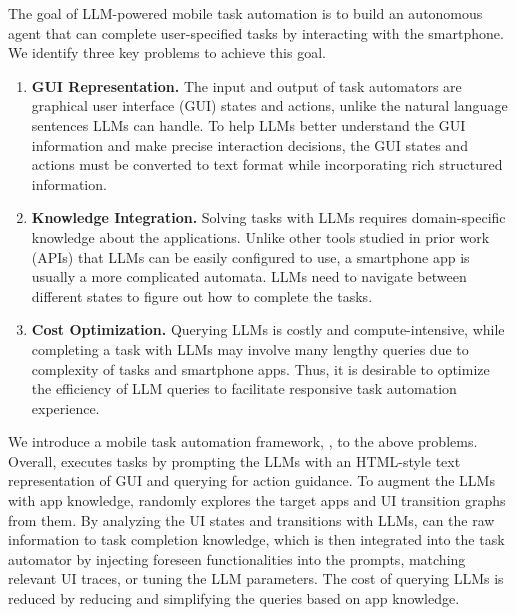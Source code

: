 The goal of LLM-powered mobile task automation is to build an autonomous agent that can complete user-specified tasks by interacting with the smartphone.  %
We identify three key problems to achieve this goal.
\begin{enumerate}
    \item \textbf{GUI Representation.} The input and output of task automators are graphical user interface (GUI) states and actions, unlike the natural language sentences LLMs can handle.
    To help LLMs better understand the GUI information and make precise interaction decisions, the GUI states and actions must be converted to text format while incorporating rich structured information.
    \item \textbf{Knowledge Integration.} Solving tasks with LLMs requires domain-specific knowledge about the applications.
    Unlike other tools studied in prior work (\eg APIs) that LLMs can be easily configured to use, a smartphone app is usually a more complicated automata. LLMs need to navigate between different states to figure out how to complete the tasks.
    \item \textbf{Cost Optimization.} Querying LLMs is costly and compute-intensive, while completing a task with LLMs may involve many lengthy queries due to complexity of tasks and smartphone apps. Thus, it is desirable to optimize the efficiency of LLM queries to facilitate responsive task automation experience.
\end{enumerate}

We introduce a mobile task automation framework, \name, to  the above problems.
Overall, \name executes tasks by prompting the LLMs with an HTML-style text representation of GUI and querying for action guidance. To augment the LLMs with app knowledge, \name randomly explores the target apps and  UI transition graphs from them. By analyzing the UI states and transitions with LLMs, \name can  the raw information to task completion knowledge, which is then integrated into the task automator by injecting foreseen functionalities into the prompts, matching relevant UI traces, or tuning the LLM parameters.
The cost of querying LLMs is reduced by reducing and simplifying the queries based on app knowledge.

